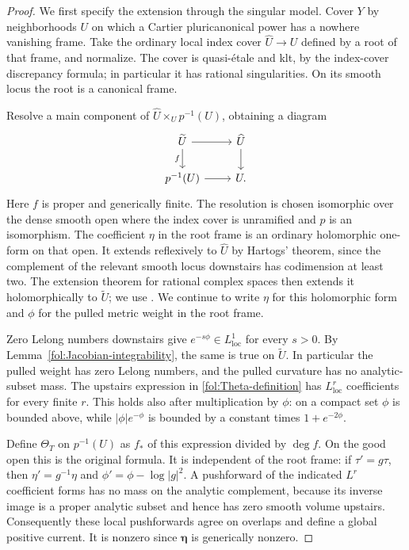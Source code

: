 \begin{proof}
We first specify the extension through the singular model.  Cover $Y$
by neighborhoods $U$ on which a Cartier pluricanonical power has a
nowhere vanishing frame.  Take the ordinary local index cover
$\widehat U\to U$ defined by a root of that frame, and normalize.
The cover is quasi-\'etale and klt, by the index-cover discrepancy
formula; in particular it has rational singularities.  On its smooth
locus the root is a canonical frame.

Resolve a main component of
$\widehat U\times_U p^{-1}(U)$, obtaining a diagram
\[
 \begin{tikzcd}
 \widetilde U \arrow[r] \arrow[d,"f"'] & \widehat U \arrow[d]\\
 p^{-1}(U) \arrow[r] & U .
 \end{tikzcd}
\]
Here $f$ is proper and generically finite.  The resolution is chosen
isomorphic over the dense smooth open where the index cover is
unramified and $p$ is an isomorphism.  The coefficient $\eta$ in the
root frame is an ordinary holomorphic one-form on that open.
It extends reflexively to $\widehat U$ by Hartogs' theorem, since the
complement of the relevant smooth locus downstairs has codimension at
least two.  The extension theorem for rational complex spaces then
extends it holomorphically to $\widetilde U$; we use
\cite[Corollary~1.8]{KebekusSchnellExtension}.
We continue to write $\eta$ for this holomorphic form and $\phi$ for the
pulled metric weight in the root frame.

Zero Lelong numbers downstairs give
$e^{-s\phi}\in L^1_{\mathrm{loc}}$ for every $s>0$.  By
Lemma~\ref{fol:Jacobian-integrability}, the same is true on
$\widetilde U$.  In particular the pulled weight has zero Lelong
numbers, and the pulled curvature has no analytic-subset mass.
The upstairs expression in \eqref{fol:Theta-definition} has
$L^r_{\mathrm{loc}}$ coefficients for every finite $r$.  This holds
also after multiplication by $\phi$: on a compact set $\phi$ is
bounded above, while $|\phi|e^{-\phi}$ is bounded by a constant times
$1+e^{-2\phi}$.

Define $\Theta_T$ on $p^{-1}(U)$ as $f_*$ of this expression divided
by $\deg f$.  On the good open this is the original formula.  It is
independent of the root frame: if $\tau'=g\tau$, then
$\eta'=g^{-1}\eta$ and $\phi'=\phi-\log|g|^2$.
A pushforward of the indicated $L^r$ coefficient forms has no mass on
the analytic complement, because its inverse image is a proper
analytic subset and hence has zero smooth volume upstairs.
Consequently these local pushforwards agree on overlaps and define
a global positive current.  It is nonzero since
$\boldsymbol\eta$ is generically nonzero.


\end{proof}

